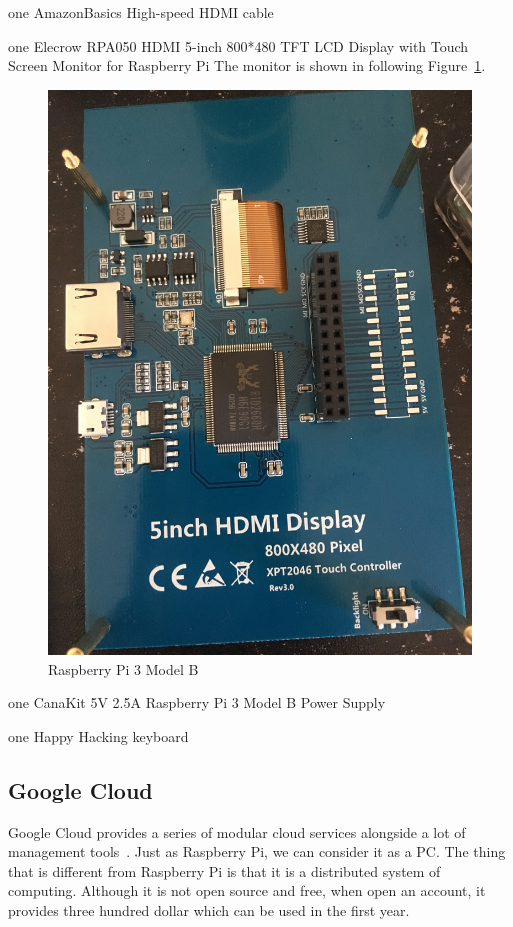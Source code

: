 one AmazonBasics High-speed HDMI cable

one Elecrow RPA050 HDMI 5-inch 800*480 TFT LCD Display with Touch
 Screen Monitor for Raspberry Pi
 The monitor is shown in following Figure~\ref{f:fly}.

\begin{figure}[!ht]
  \centering\includegraphics[width=\columnwidth]{images/display.jpeg}
  \caption{Raspberry Pi 3 Model B}\label{f:fly}
\end{figure}

one CanaKit 5V 2.5A Raspberry Pi 3 Model B Power Supply

one Happy Hacking keyboard

\subsection{Google Cloud}
Google Cloud provides a series of modular cloud services alongside a lot of
 management tools~\cite{hid-sp18-508-googleCloud}. Just as Raspberry Pi,
 we can consider it as a PC. The thing that is different from Raspberry Pi is
 that it is a distributed system of computing. Although
  it is not open source and free, when open an account,
 it provides three hundred dollar which can be used in the first year.
 
